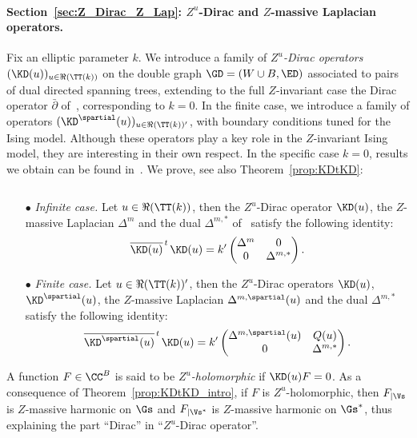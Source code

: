 \documentclass[a4paper,twoside,11pt]{article}
\begin{document}
\paragraph{Section~\ref{sec:Z_Dirac_Z_Lap}: $Z^u$-Dirac and $Z$-massive Laplacian operators.} Fix an elliptic parameter $k$. We
introduce a family of \emph{$Z^u$-Dirac operators} $(\KD(u))_{u\in\Re(\TT(k))}$ 
on the double graph 
$\GD=(W\cup B,\ED)$ associated to pairs of dual directed spanning trees, extending to  
the full $Z$-invariant case the Dirac operator $\bar{\partial}$ of~\cite{Kenyon3}, corresponding to $k=0$.
In the finite case, we introduce a family of operators $(\KD^\spartial(u))_{u\in\Re(\TT(k))'}$, with boundary conditions 
tuned for the Ising model. Although these operators play a key role in the $Z$-invariant Ising model, they are interesting in their own 
respect. In the specific case $k=0$, results we obtain can be found in~\cite{Kenyon3,Temperley,Kennelly}. 
We prove, see also Theorem~\ref{prop:KDtKD}:
\begin{thm}\label{prop:KDtKD_intro}$\,$
\begin{itemize}
 \item[$\bullet$] \emph{Infinite case.} Let $u\in\Re(\TT(k))$, then the $Z^u$-Dirac operator $\KD(u)$, the $Z$-massive Laplacian 
 $\Delta^m$ and the dual 
 $\Delta^{m,*}$ of~\cite{BdTR1} satisfy the following identity:
\begin{equation*} 
\overline{\KD(u)}^{\,t\,}\KD(u)=k'
\begin{pmatrix}
\Delta^m&0\\
0&\Delta^{m,*}
\end{pmatrix}.
\end{equation*}\item[$\bullet$] \emph{Finite case.} Let $u\in\Re(\TT(k))'$, then the $Z^u$-Dirac operators $\KD(u)$, $\KD^\spartial(u)$, 
the $Z$-massive Laplacian
$\Delta^{m,\spartial}(u)$ and the dual $\Delta^{m,*}$ satisfy the following identity:
\begin{equation*} 
\overline{\KD^\spartial(u)}^{\,t\,}\KD(u)=k'
\begin{pmatrix}
\Delta^{m,\spartial}(u)& Q(u)\\
0&\Delta^{m,*}
\end{pmatrix}.
\end{equation*}
\end{itemize} 
\end{thm}
A function $F\in\CC^{B}$ is said to be \emph{$Z^u$-holomorphic} if $\KD(u)F=0$. As a consequence of Theorem~\ref{prop:KDtKD_intro}, if 
$F$ is $Z^u$-holomorphic, then $F_{| \Vs}$ is $Z$-massive harmonic on $\Gs$ and $F_{| \Vs^*}$ is $Z$-massive harmonic on $\Gs^*$, thus 
explaining the part ``Dirac'' in ``$Z^u$-Dirac operator''.
\end{document}
